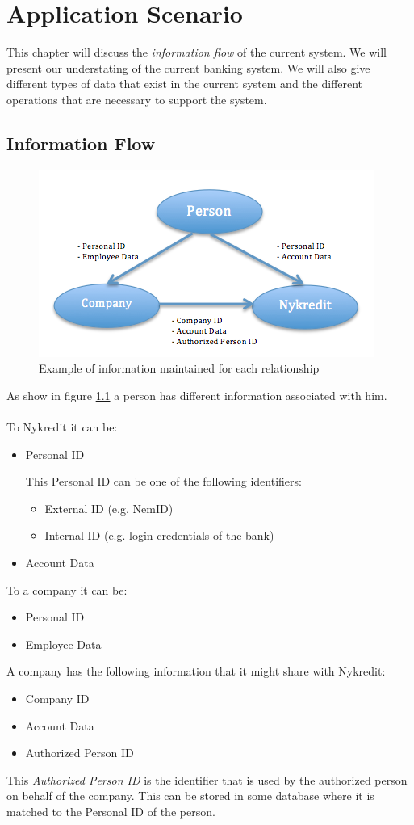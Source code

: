 \chapter{Application Scenario}

This chapter will discuss the \textit{information flow} of the current system. We will present our understating of the current banking system. We will also give different types of data that exist in the current system and the different operations that are necessary to support the system.
\section{Information Flow}
\begin{figure}[h]
	\centering
	\includegraphics[width=\textwidth]{figures/Flow}
	\caption{Example of information maintained for each relationship}
	\label{fig:Flow}
\end{figure}
As show in figure \ref{fig:Flow} a person has different information associated with him. 
\\
\\To Nykredit it can be:
\begin{itemize}
	\item Personal ID
	 
	 This Personal ID can be one of the following identifiers:
	\begin{itemize}
		\item External ID (e.g. NemID)
		\item Internal ID (e.g. login credentials of the bank)
	\end{itemize}
\item Account Data
\end{itemize}
To a company it can be:
\begin{itemize}
	\item Personal ID
	\item Employee Data
\end{itemize}
A company has the following information that it might share with Nykredit:
\begin{itemize}
	\item Company ID	
	\item Account Data
	\item Authorized Person ID
\end{itemize}
This \textit{Authorized Person ID} is the identifier that is used by the authorized person on behalf of the company. This can be stored in some database where it is matched to the Personal ID of the person.

